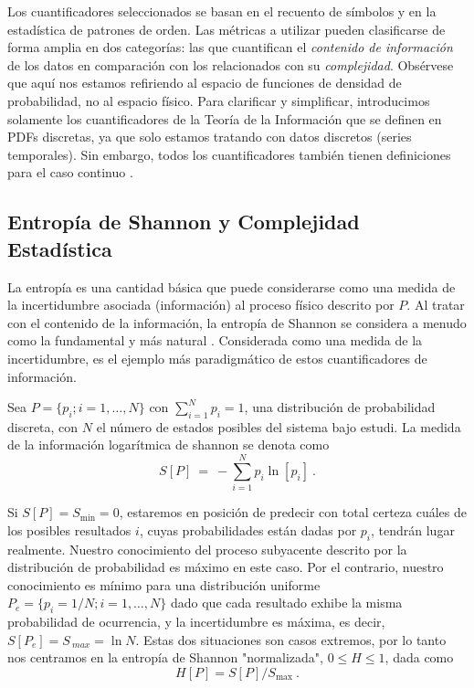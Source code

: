 Los cuantificadores seleccionados se basan en el recuento de símbolos y en la estadística de patrones de orden.
Las métricas a utilizar pueden clasificarse de forma amplia en dos categorías: las que cuantifican el \textit{contenido de información} de los datos en comparación con los relacionados con su \textit{complejidad}.
Obsérvese que aquí nos estamos refiriendo al espacio de funciones de densidad de probabilidad, no al espacio físico.
Para clarificar y simplificar, introducimos solamente los cuantificadores de la Teoría de la Información que se definen en PDFs discretas, ya que solo estamos tratando con datos discretos (series temporales).
Sin embargo, todos los cuantificadores también tienen definiciones para el caso continuo \cite{Shannon1948}.

\subsection{Entropía de Shannon y Complejidad Estadística}

La entropía es una cantidad básica que puede considerarse como una medida de la incertidumbre asociada (información) al proceso físico descrito por $P$.
Al tratar con el contenido de la información, la entropía de Shannon se considera a menudo como la fundamental y más natural \cite{Shannon1948}.
Considerada como una medida de la incertidumbre, es el ejemplo más paradigmático de estos cuantificadores de información.

Sea $P=\{p_i; i=1,\ldots, N\}$ con $\sum_{i=1}^N p_i = 1$, una distribución de probabilidad discreta, con $N$ el número de estados posibles del sistema bajo estudi.
La medida de la información logarítmica de shannon se denota como
\begin{equation}
\label{Shannon-disc}
S[P] ~=~ -\sum_{i=1}^{N} p_i \ln \left[ p_i \right] \ .
\end{equation}

Si $S[P] = S_{\min} = 0$, estaremos en posición de predecir con total certeza cuáles de los posibles resultados $i$, cuyas probabilidades están dadas por $p_i$, tendrán lugar realmente.
Nuestro conocimiento del proceso subyacente descrito por la distribución de probabilidad es máximo en este caso.
Por el contrario, nuestro conocimiento es mínimo para una distribución uniforme $P_e = \{p_i = 1/N; i = 1, \ldots, N \}$ dado que cada resultado exhibe la misma probabilidad de ocurrencia, y la incertidumbre es máxima, es decir, $S[P_e] = S_{\ max} = \ln N$.
Estas dos situaciones son casos extremos, por lo tanto nos centramos en la entropía de Shannon "normalizada", $0 \leq H \leq 1$, dada como
\begin{equation}
\label{shannon-disc-normalizada}
H[P] = S[P] / S_{\max} \ .
\end{equation}

